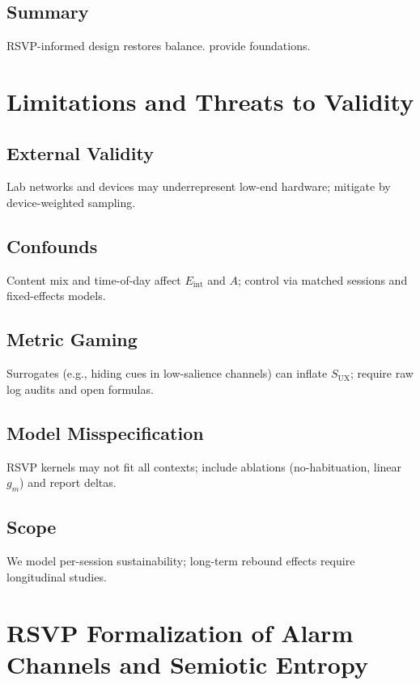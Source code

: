 \documentclass[openany]{book}
\newcommand{\Eint}{E_{\mathrm{int}}} %
\newcommand{\SUX}{S_{\mathrm{UX}}} %
\begin{document}
\section{Summary}
RSVP-informed design restores balance.  provide foundations.

\chapter{Limitations and Threats to Validity}
\label{ch:limits}

\section{External Validity}
Lab networks and devices may underrepresent low-end hardware; mitigate by device-weighted sampling.

\section{Confounds}
Content mix and time-of-day affect $\Eint$ and $A$; control via matched sessions and fixed-effects models.

\section{Metric Gaming}
Surrogates (e.g., hiding cues in low-salience channels) can inflate $\SUX$; require raw log audits and open formulas.

\section{Model Misspecification}
RSVP kernels may not fit all contexts; include ablations (no-habituation, linear $g_m$) and report deltas.

\section{Scope}
We model per-session sustainability; long-term rebound effects require longitudinal studies.


\appendix

\chapter{RSVP Formalization of Alarm Channels and Semiotic Entropy}
\label{app:rsvp}
\end{document}
